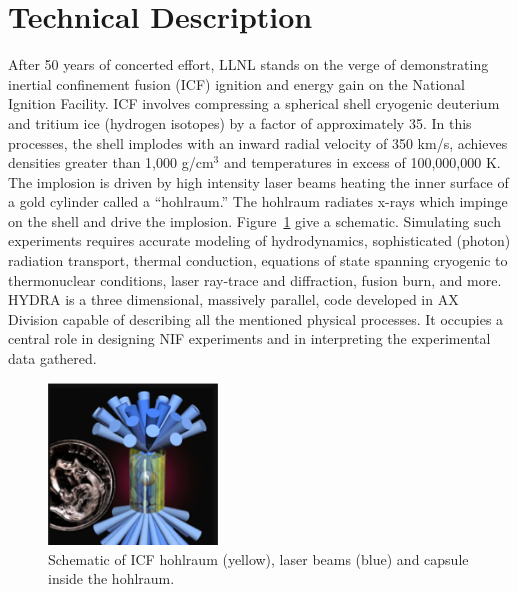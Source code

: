 \documentclass[letterpaper,11pt]{article}
\begin{document}

\section*{Technical Description}

After 50 years of concerted effort, LLNL stands on the verge of demonstrating inertial 
confinement fusion (ICF) ignition and energy gain on the National Ignition Facility\@.
ICF involves compressing a spherical shell cryogenic deuterium and tritium ice (hydrogen isotopes) by a factor of approximately 35.  In this processes, the shell implodes with an inward radial
velocity of 350 km/s, achieves densities greater than
1,000 g/cm${}^3$ and temperatures in
excess of 100,000,000 K.  The implosion is driven by high intensity laser beams heating 
the inner surface of a gold cylinder called a ``hohlraum.''  The hohlraum radiates x-rays 
which impinge on the shell and drive the implosion.  Figure~\ref{hohlraum} give a schematic.  Simulating such experiments requires accurate modeling of
hydrodynamics, sophisticated (photon) radiation transport, thermal conduction, equations 
of state spanning cryogenic to thermonuclear conditions, laser ray-trace and diffraction, fusion burn, and more.
HYDRA is a three dimensional, massively parallel, code developed in AX Division capable of describing all the mentioned physical processes.
It occupies a central role in designing NIF experiments and in interpreting the experimental data gathered.  

\begin{figure}
	\vspace{-25pt}
	\begin{center}
		\includegraphics[width=0.40\textwidth]{hohlraum.jpg}
	\end{center}
	\caption{Schematic of ICF hohlraum (yellow), laser beams (blue) and capsule inside the hohlraum.}
	\label{hohlraum}
\end{figure}
\end{document}
